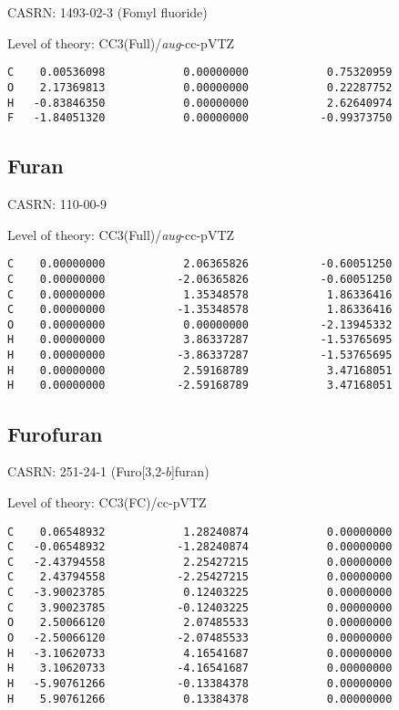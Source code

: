 \documentclass[journal=jctcce,manuscript=article,layout=traditional]{achemso}
\newcommand{\TZ}{cc-pVTZ}
\newcommand{\AVTZ}{\emph{aug}-cc-pVTZ}
\begin{document}
CASRN: 1493-02-3 (Fomyl fluoride)

\begin{singlespace}
\noindent  Level of theory: CC3(Full)/{\AVTZ}
\begin{verbatim}
C    0.00536098            0.00000000            0.75320959
O    2.17369813            0.00000000            0.22287752
H   -0.83846350            0.00000000            2.62640974
F   -1.84051320            0.00000000           -0.99373750
\end{verbatim}
\end{singlespace}

\subsection{Furan}

CASRN: 110-00-9

\begin{singlespace}
\noindent  Level of theory: CC3(Full)/{\AVTZ}
\begin{verbatim}
C    0.00000000            2.06365826           -0.60051250
C    0.00000000           -2.06365826           -0.60051250
C    0.00000000            1.35348578            1.86336416
C    0.00000000           -1.35348578            1.86336416
O    0.00000000            0.00000000           -2.13945332
H    0.00000000            3.86337287           -1.53765695
H    0.00000000           -3.86337287           -1.53765695
H    0.00000000            2.59168789            3.47168051
H    0.00000000           -2.59168789            3.47168051
\end{verbatim}
\end{singlespace}

\subsection{Furofuran}

CASRN: 251-24-1 (Furo[3,2-$b$]furan)

\begin{singlespace}
\noindent  Level of theory: CC3(FC)/{\TZ}
\begin{verbatim}
C    0.06548932            1.28240874            0.00000000
C   -0.06548932           -1.28240874            0.00000000
C   -2.43794558            2.25427215            0.00000000
C    2.43794558           -2.25427215            0.00000000
C   -3.90023785            0.12403225            0.00000000
C    3.90023785           -0.12403225            0.00000000
O    2.50066120            2.07485533            0.00000000
O   -2.50066120           -2.07485533            0.00000000
H   -3.10620733            4.16541687            0.00000000
H    3.10620733           -4.16541687            0.00000000
H   -5.90761266           -0.13384378            0.00000000
H    5.90761266            0.13384378            0.00000000
\end{verbatim}
\end{singlespace}
\end{document}
